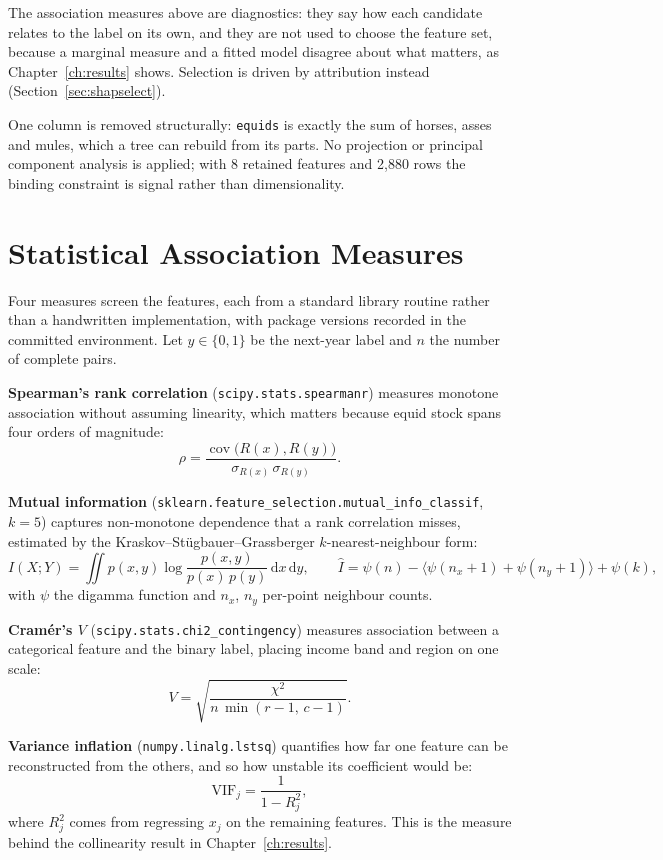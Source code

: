 \documentclass[10pt,openany]{report}
\begin{document}
The association measures above are diagnostics: they say how each candidate relates to the label on
its own, and they are not used to choose the feature set, because a marginal measure and a fitted
model disagree about what matters, as Chapter~\ref{ch:results} shows. Selection is driven by
attribution instead (Section~\ref{sec:shapselect}).

One column is removed structurally: \texttt{equids} is exactly the sum of horses, asses and mules,
which a tree can rebuild from its parts. No projection or principal component analysis is applied;
with 8 retained features and 2,880 rows the binding constraint is signal rather than
dimensionality.

\section{Statistical Association Measures}
\label{sec:assoc}

Four measures screen the features, each from a standard library routine rather than a handwritten
implementation, with package versions recorded in the committed environment. Let $y\in\{0,1\}$ be the next-year
label and $n$ the number of complete pairs.

\textbf{Spearman's rank correlation} (\texttt{scipy.stats.spearmanr}) measures monotone association
without assuming linearity, which matters because equid stock spans four orders of magnitude:
\[
\rho = \frac{\operatorname{cov}\big(R(x), R(y)\big)}{\sigma_{R(x)}\,\sigma_{R(y)}} .
\]

\textbf{Mutual information} (\texttt{sklearn.feature\_selection.mutual\_info\_classif}, $k=5$)
captures non-monotone dependence that a rank correlation misses, estimated by the
Kraskov--St\"ugbauer--Grassberger $k$-nearest-neighbour form:
\[
I(X;Y)=\iint p(x,y)\log\frac{p(x,y)}{p(x)\,p(y)}\,\mathrm{d}x\,\mathrm{d}y,
\qquad
\hat{I}=\psi(n)-\big\langle\psi(n_x{+}1)+\psi(n_y{+}1)\big\rangle+\psi(k),
\]
with $\psi$ the digamma function and $n_x$, $n_y$ per-point neighbour counts.

\textbf{Cram\'er's $V$} (\texttt{scipy.stats.chi2\_contingency}) measures association between a
categorical feature and the binary label, placing income band and region on one scale:
\[
V=\sqrt{\frac{\chi^2}{n\,\min(r-1,\,c-1)}} .
\]

\textbf{Variance inflation} (\texttt{numpy.linalg.lstsq}) quantifies how far one feature can be
reconstructed from the others, and so how unstable its coefficient would be:
\[
\mathrm{VIF}_j=\frac{1}{1-R_j^2},
\]
where $R_j^2$ comes from regressing $x_j$ on the remaining features. This is the measure behind the
collinearity result in Chapter~\ref{ch:results}.
\end{document}

